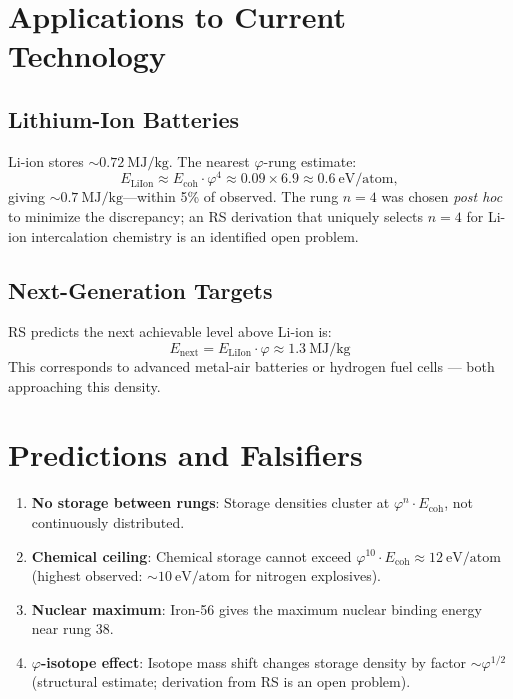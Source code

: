 \documentclass[12pt,a4paper]{article}
\theoremstyle{definition}
\theoremstyle{remark}
\begin{document}
\section{Applications to Current Technology}

\subsection{Lithium-Ion Batteries}

Li-ion stores $\sim 0.72~\mathrm{MJ/kg}$. The nearest $\varphi$-rung estimate:
\begin{equation}
E_\mathrm{LiIon} \approx E_\mathrm{coh} \cdot \varphi^{4}
\approx 0.09 \times 6.9 \approx 0.6~\mathrm{eV/atom},
\end{equation}
giving $\sim 0.7~\mathrm{MJ/kg}$---within 5\% of observed.
The rung $n = 4$ was chosen \emph{post hoc} to minimize the discrepancy;
an RS derivation that uniquely selects $n = 4$ for Li-ion intercalation
chemistry is an identified open problem.

\subsection{Next-Generation Targets}

RS predicts the next achievable level above Li-ion is:
\begin{equation}
E_\mathrm{next} = E_\mathrm{LiIon} \cdot \varphi \approx 1.3~\mathrm{MJ/kg}
\end{equation}
This corresponds to advanced metal-air batteries or 
hydrogen fuel cells — both approaching this density.

\section{Predictions and Falsifiers}

\begin{enumerate}
\item \textbf{No storage between rungs}: Storage densities cluster at $\varphi^n \cdot E_\mathrm{coh}$, 
not continuously distributed.

\item \textbf{Chemical ceiling}: Chemical storage cannot exceed $\varphi^{10} \cdot E_\mathrm{coh} \approx 12~\mathrm{eV/atom}$ (highest observed: $\sim 10~\mathrm{eV/atom}$ for nitrogen explosives).

\item \textbf{Nuclear maximum}: Iron-56 gives the maximum nuclear binding energy near rung 38.

\item \textbf{$\varphi$-isotope effect}: Isotope mass shift changes storage density by factor $\sim \varphi^{1/2}$ (structural estimate; derivation from RS is an open problem).
\end{enumerate}
\end{document}
